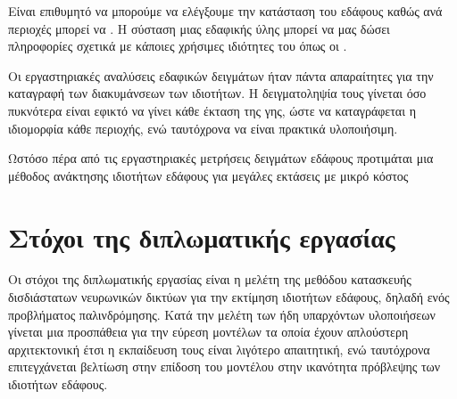 Είναι επιθυμητό να μπορούμε να ελέγξουμε την κατάσταση του εδάφους καθώς ανά περιοχές μπορεί να . Η σύσταση μιας εδαφικής ύλης μπορεί να μας δώσει πληροφορίες σχετικά με κάποιες χρήσιμες ιδιότητες του όπως οι .

Οι εργαστηριακές αναλύσεις εδαφικών δειγμάτων ήταν πάντα απαραίτητες για την καταγραφή των διακυμάνσεων των ιδιοτήτων. Η δειγματοληψία τους γίνεται όσο πυκνότερα είναι εφικτό να γίνει κάθε έκταση της γης, ώστε να καταγράφεται η ιδιομορφία κάθε περιοχής, ενώ ταυτόχρονα να είναι πρακτικά υλοποιήσιμη.

Ωστόσο πέρα από τις εργαστηριακές μετρήσεις δειγμάτων εδάφους προτιμάται μια μέθοδος ανάκτησης ιδιοτήτων εδάφους για μεγάλες εκτάσεις με μικρό κόστος

\section{Στόχοι της διπλωματικής εργασίας}
Οι στόχοι της διπλωματικής εργασίας είναι η μελέτη της μεθόδου κατασκευής δισδιάστατων νευρωνικών δικτύων για την εκτίμηση ιδιοτήτων εδάφους, δηλαδή ενός προβλήματος παλινδρόμησης. Κατά την μελέτη των ήδη υπαρχόντων υλοποιήσεων γίνεται μια προσπάθεια για την εύρεση μοντέλων τα οποία έχουν απλούστερη αρχιτεκτονική έτσι η εκπαίδευση τους είναι λιγότερο απαιτητική, ενώ ταυτόχρονα επιτεγχάνεται βελτίωση στην επίδοση του μοντέλου στην ικανότητα πρόβλεψης των ιδιοτήτων εδάφους. 

